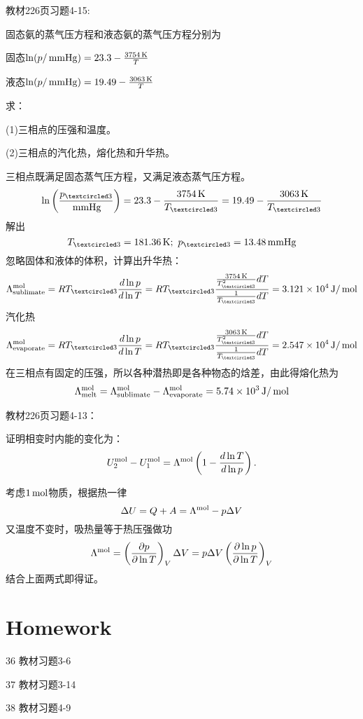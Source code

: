 \documentclass[CJK]{beamer}
\begin{document}
\begin{frame}
  \chtitle{\proid (\stwo)}
  \bch
  教材226页习题4-15:

  固态氨的蒸气压方程和液态氨的蒸气压方程分别为
  
  固态$\ln(p/\,\mathrm{mmHg}) = 23.3 - \frac{3754\,\mathrm{K}}{T}$

  液态$\ln(p/\,\mathrm{mmHg}) = 19.49 -\frac{3063\,\mathrm{K}}{T}$

  求：

  (1)三相点的压强和温度。

  (2)三相点的汽化热，熔化热和升华热。
  \ech
\end{frame}


\begin{frame}
  \bch
      {\scriptsize
        三相点既满足固态蒸气压方程，又满足液态蒸气压方程。
        $$\ln\left(\frac{\pthree}{\SImmHg}\right) = 23.3-\frac{3754\SIK}{\Tthree} = 19.49 - \frac{3063 \SIK}{\Tthree}$$
        解出
        $$\Tthree = 181.36\SIK;\ \pthree = 13.48\SImmHg$$
        忽略固体和液体的体积，计算出升华热：
        $$\Lambda^{\rm mol}_{\rm sublimate} = R\Tthree \frac{d\ln p}{d\ln T} = R\Tthree \frac{ \frac{3754\SIK }{\Tthree^2} dT }{\frac{1}{\Tthree} dT} = 3.121\times 10^4 \SIJ/\SImol $$
        汽化热
        $$\Lambda^{\rm mol}_{\rm evaporate} = R\Tthree \frac{d\ln p}{d\ln T} = R\Tthree \frac{ \frac{3063\SIK }{\Tthree^2} dT }{\frac{1}{\Tthree} dT} = 2.547\times 10^4 \SIJ/\SImol $$
        在三相点有固定的压强，所以各种潜热即是各种物态的焓差，由此得熔化热为
        $$\Lambda^{\rm mol}_{\rm melt} = \Lambda^{\rm mol}_{\rm sublimate} - \Lambda^{\rm mol}_{\rm evaporate} = 5.74 \times 10^3 \,\mathrm{J}/\,\mathrm{mol}$$
        
      }
  \ech
\end{frame}

\begin{frame}
  \chtitle{\proid (\stwo)}
  \bch
  教材226页习题4-13：

  证明相变时内能的变化为：
  $$U_2^{\rm mol}-U^{\rm mol}_1 = \Lambda^{\rm mol}\left(1-\frac{d\ln T}{d\ln p}\right).$$
  \ech
\end{frame}


\begin{frame}
  \bch
      {\small
        考虑$1\,\mathrm{mol}$物质，根据热一律
        $$ \Delta U = Q + A = \Lambda^{\rm mol} - p \Delta V$$
        又温度不变时，吸热量等于热压强做功
        $$\Lambda^{\rm mol} = \left(\frac{\partial p}{\partial \ln T}\right)_{V} \Delta V = p\Delta V \left(\frac{\partial \ln p}{\partial \ln T}\right)_{V} $$
        结合上面两式即得证。
      }
  \ech
\end{frame}

\section{Homework}

\begin{frame}
  \bch
  {\small 
    \bitem
\item[36]{教材习题3-6}
\item[37]{教材习题3-14}
\item[38]{教材习题4-9}
  \eitem
  }
  \ech
\end{frame}
\end{document}
